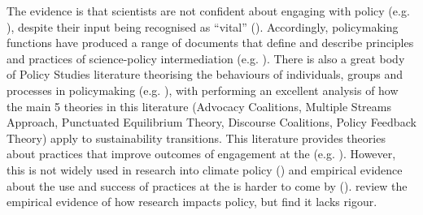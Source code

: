 The evidence is that scientists are not confident about engaging with policy (e.g. \cite{KEU2021perceptions}), despite their input being recognised as ``vital'' (\cite{KennyRHTB2017}). Accordingly, policymaking functions have produced a range of documents that define and describe principles and practices of science-policy intermediation (e.g. \cite{OECD2015,DottiACDMPSVW2024,KarkkainenLKK2024}). There is also a great body of Policy Studies literature theorising the behaviours of individuals, groups and processes in policymaking (e.g. \cite{Kingdon1993,Hajer2005,Dowding2018}), with \textcite{KernR2018} performing an excellent analysis of how the main 5 theories in this literature (Advocacy Coalitions, Multiple Streams Approach, Punctuated Equilibrium Theory, Discourse Coalitions, Policy Feedback Theory) apply to sustainability transitions. This literature provides theories about practices that improve outcomes of engagement at the \SPI{} (e.g. \cite{RykielEtAl2002,McNie2007,Gluckman2014,BlessenohlS2022}). However, this is not widely used in research into climate policy (\cite{CairneyTS2023}) and empirical evidence about the use and success of practices at the \SPI{} is harder to come by (\cite{JagannathanEtAl2023}). \textcite{OliverHBGC2022} review the empirical evidence of how research impacts policy, but find it lacks rigour. 

